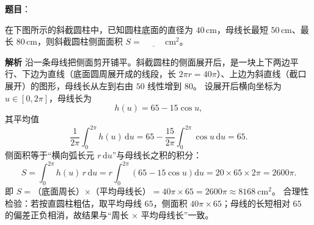 \begin{answer}

\textbf{题目}：

在下图所示的斜截圆柱中，已知圆柱底面的直径为 $40\,\mathrm{cm}$，母线长最短 $50\,\mathrm{cm}$、最长 $80\,\mathrm{cm}$，则斜截圆柱侧面面积 $S=$ $\underline{\qquad}$ $\mathrm{cm}^2$。
\nopagebreak[4]
\begin{center}\end{center}
\nopagebreak[4]
\textbf{解析}
沿一条母线把侧面剪开铺平。斜截圆柱的侧面展开后，是一块上下两边平行、下边为直线（底面圆周展开成的线段，长 $2\pi r=40\pi$）、上边为斜直线（截口展开）的图形，母线长从左到右由 $50$ 线性增到 $80$。
设展开后横向坐标为 $u\in[0,2\pi]$，母线长为
\nopagebreak[4]
\[h(u)=65-15\cos u,\]
其平均值
\nopagebreak[4]
\[\frac1{2\pi}\int_0^{2\pi}h(u)\,\mathrm du=65-\frac{15}{2\pi}\int_0^{2\pi}\cos u\,\mathrm du=65.\]
侧面积等于“横向弧长元 $r\,\mathrm du$”与母线长之积的积分：
\nopagebreak[4]
\[S=\int_0^{2\pi}h(u)\,r\,\mathrm du=r\int_0^{2\pi}\left(65-15\cos u\right)\mathrm du=20\times65\times2\pi=2600\pi.\]
即 $S=$（底面周长）$\times$（平均母线长）$=40\pi\times65=2600\pi\approx8168\ \mathrm{cm}^2$。
合理性检验：若按直圆柱粗估，取平均母线 $65$，侧面积 $40\pi\times65$；母线的长短相对 $65$ 的偏差正负相消，故结果与“周长 × 平均母线长”一致。


\end{answer}
